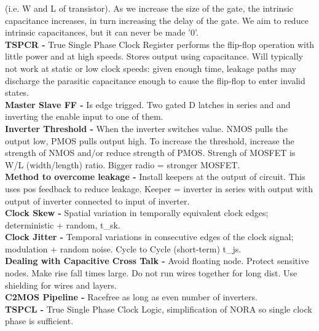 \documentclass[9pt,fleqn]{article}
\begin{document}
\begin{multicols}{3}
    (i.e. W and L of transistor).  As we increase the size of the gate, the
    intrinsic capacitance increases, in turn increasing the delay of the gate.
    We aim to reduce intrinsic capacitances, but it can never be made '0'.\\
    \textbf{TSPCR -} True Single Phase Clock Register performs the flip-flop
    operation with little power and at high speeds. Stores output using
    capacitance. Will typically not work at static or low clock speeds: given
    enough time, leakage paths may discharge the parasitic capacitance enough
    to cause the flip-flop to enter invalid states.\\
    \textbf{Master Slave FF -} Is edge trigged. Two gated D latches in series
    and and inverting the enable input to one of them.\\
    \textbf{Inverter Threshold -} When the inverter switches value. NMOS pulls
    the output low, PMOS pulls output high. To increase the threshold,
    increase the strength of NMOS and/or reduce strength of PMOS. Strengh of
    MOSFET is W/L (width/length) ratio. Bigger radio = stronger MOSFET.\\
    \textbf{Method to overcome leakage -} Install keepers at the output of
    circuit. This uses pos feedback to reduce leakage. Keeper = inverter in
    series with output with output of inverter connected to input of inverter.\\
    \textbf{Clock Skew -} Spatial variation in temporally equivalent clock
    edges; deterministic + random, t\_sk. \\
    \textbf{Clock Jitter -} Temporal variations in consecutive edges of the
    clock signal; modulation + random noise. Cycle to Cycle (short-term) t\_js.\\
    \textbf{Dealing with Capacitive Cross Talk -} Avoid floating node. Protect
    sensitive nodes. Make rise fall times large. Do not run wires together for
    long dist. Use shielding for wires and layers. \\
    \textbf{C2MOS Pipeline -} Racefree as long as even number of inverters. \\
    \textbf{TSPCL -} True Single Phase Clock Logic, simplification of NORA so
    single clock phase is sufficient.\\


\end{multicols}
\end{document}
